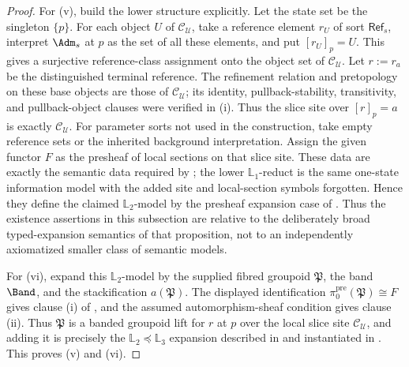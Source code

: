 \begin{proof}
For \textup{(v)}, build the lower structure explicitly. Let the state set be
the singleton $\{p\}$. For each object $U$ of $\mathcal C_{\mathcal U}$, take a
reference element $r_U$ of sort $\mathsf{Ref}_s$, interpret $\Adm_s$ at $p$ as
the set of all these elements, and put $[r_U]_p=U$. This gives a surjective
reference-class assignment onto the object set of $\mathcal C_{\mathcal U}$.
Let $r:=r_a$ be the distinguished terminal reference. The refinement relation
and pretopology on these base objects are those of
$\mathcal C_{\mathcal U}$; its identity, pullback-stability, transitivity, and
pullback-object clauses were verified in \textup{(i)}. Thus the slice site over
$[r]_p=a$ is exactly $\mathcal C_{\mathcal U}$. For parameter sorts not used in
the construction, take empty reference sets or the inherited background
interpretation. Assign the given functor $F$ as the presheaf of local sections on
that slice site. These data are exactly the semantic data required by
;
the lower $\mathbb L_1$-reduct is the same one-state information model with
the added site and local-section symbols forgotten. Hence they define the
claimed $\mathbb L_2$-model by the presheaf expansion case of
. Thus the existence
assertions in this subsection are relative to the deliberately broad
typed-expansion semantics of that proposition, not to an
independently axiomatized smaller class of semantic models.

For \textup{(vi)}, expand this $\mathbb L_2$-model by the supplied fibred
groupoid $\mathfrak P$, the band $\Band$, and the stackification
$a(\mathfrak P)$. The displayed identification
$\pi_0^{\mathrm{pre}}(\mathfrak P)\cong F$ gives clause \textup{(i)} of
, and the assumed automorphism-sheaf condition
gives clause \textup{(ii)}. Thus $\mathfrak P$ is a banded groupoid lift for
$r$ at $p$ over the local slice site $\mathcal C_{\mathcal U}$, and adding it
is precisely the $\mathbb L_2\preceq\mathbb L_3$ expansion described in
 and
instantiated in .
This proves \textup{(v)} and \textup{(vi)}.
\end{proof}

